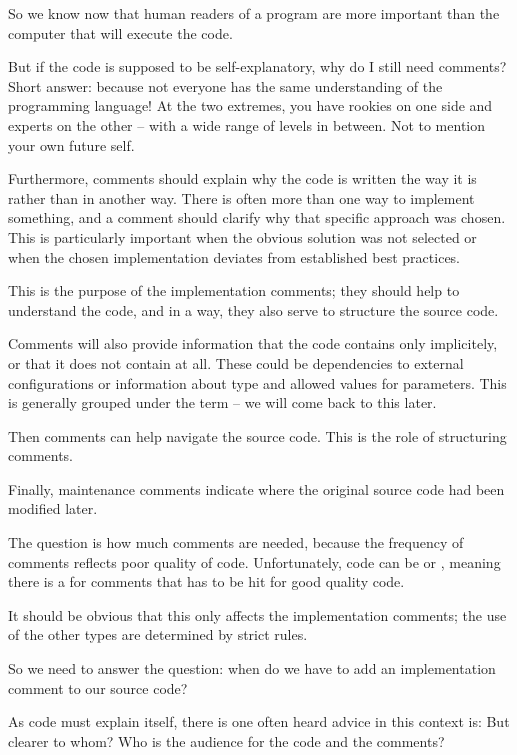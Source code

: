 So we know now that human readers of a program are more important than the computer that will execute the code.

But if the code is supposed to be self-explanatory, why do I still need comments? Short answer: because not everyone has the same understanding of the programming language! At the two extremes, you have rookies on one side and experts on the other – with a wide range of levels in between. Not to mention your own future self.

Furthermore, comments should explain why the code is written the way it is rather than in another way. There is often more than one way to implement something, and a comment should clarify why that specific approach was chosen. This is particularly important when the obvious solution was not selected or when the chosen implementation deviates from established best practices.

This is the purpose of the implementation comments; they should help to understand the code, and in a way, they also serve to structure the source code.

Comments will also provide information that the code contains only implicitely, or that it does not contain at all. These could be dependencies to external configurations or information about type and allowed values for parameters. This is generally grouped under the term  – we will come back to this later.

Then comments can help navigate the source code. This is the role of structuring comments.

Finally, maintenance comments indicate where the original source code had been modified later.

The question is how much comments are needed, because the frequency of comments reflects poor quality of code. Unfortunately, code can be  or , meaning there is a  for comments that has to be hit for good quality code.

It should be obvious that this only affects the implementation comments; the use of the other types are determined by strict rules.

So we need to answer the question: when do we have to add an implementation comment to our source code?

As code must explain itself, there is one often heard advice in this context is:  But clearer to whom? Who is the audience for the code and the comments?

